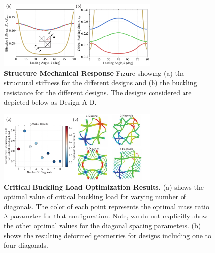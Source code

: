 \documentclass[10pt,twocolumn,twoside]{fernandes_paper}
\begin{document}
\begin{figure}[ht]
	\captionsetup{width=0.8\textwidth}
	\begin{center}
		\includegraphics[width=0.7\textwidth]{Fig3}
	\end{center}
	\caption{\textbf{Structure Mechanical Response} Figure showing (a) the structural stiffness for the different designs and (b) the buckling resistance for the different designs. The designs considered are depicted below as Design A-D.} \label{Fig3}
\end{figure}

\begin{figure}[ht]
	\captionsetup{width=0.8\textwidth}
	\begin{center}
		\includegraphics[width=0.7\textwidth]{Fig4}
	\end{center}
	\caption{\textbf{Critical Buckling Load Optimization Results.} (a) shows the optimal value of critical buckling load for varying number of diagonals. The color of each point represents the optimal mass ratio $\lambda$  parameter for that configuration.  Note, we do not explicitly show the other optimal values for the diagonal spacing parameters. (b) shows the resulting deformed geometries for designs including one to four diagonals.} \label{Fig4}
\end{figure}
\end{document}
